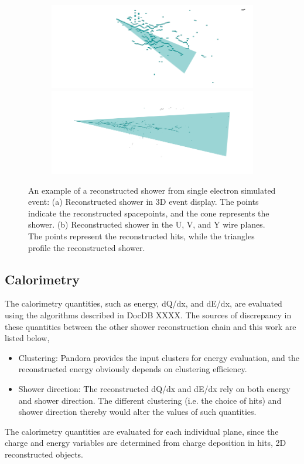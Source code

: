 \begin{figure}[htbp]
\begin{center}
\begin{subfigure}{0.45\textwidth}
\includegraphics[width=0.85\linewidth]{figs/reco/single_e_Evt1V.png}\\
\includegraphics[width=0.85\linewidth]{figs/reco/single_e_Evt1Y.png}
\caption{}
\label{fig:shr_reco_example_2d}
\end{subfigure}
\caption{An example of a reconstructed shower from single electron
simulated event: (a) Reconstructed shower in 3D event display.
The points indicate the reconstructed spacepoints, and the cone
represents the shower.
(b) Reconstructed shower in the U, V, and Y wire planes.
The points represent the reconstructed hits, while the triangles
profile the reconstructed shower.}
\label{fig:shr_reco_example}
\end{center}
\end{figure}

\subsection{Calorimetry}
\label{sec:shr_calorimetry}

The calorimetry quantities, such as energy, dQ/dx, and dE/dx, are
evaluated using the algorithms described in DocDB XXXX.
The sources of discrepancy in these quantities between the other
shower reconstruction chain and this work are listed below,
\begin{itemize}
\item Clustering: Pandora provides the input clusters for energy
      evaluation, and the reconstructed energy obviously depends
      on clustering efficiency.
\item Shower direction: The reconstructed dQ/dx and dE/dx rely on
      both energy and shower direction.  
      The different clustering (i.e. the  choice of hits) and 
      shower direction thereby would alter the values of such
      quantities.
\end{itemize}

The calorimetry quantities are evaluated for each individual plane,
since the charge and energy variables are determined from charge
deposition in hits, 2D reconstructed objects.

